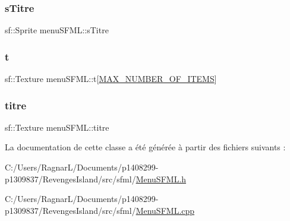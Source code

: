 \mbox{\label{classmenu_s_f_m_l_ad5b55373042af434e3db87a383f88ffe}} 
\subsubsection{\texorpdfstring{s\+Titre}{sTitre}}
{\footnotesize\ttfamily sf\+::\+Sprite menu\+S\+F\+M\+L\+::s\+Titre\hspace{0.3cm}{\ttfamily [private]}}

\mbox{\label{classmenu_s_f_m_l_ac268697287b7dc41dcae13b91193c6cf}} 
\subsubsection{\texorpdfstring{t}{t}}
{\footnotesize\ttfamily sf\+::\+Texture menu\+S\+F\+M\+L\+::t\mbox{[}\hyperlink{_menu_s_f_m_l_8h_a34e819be6bb222b369578bb037bb3564}{M\+A\+X\+\_\+\+N\+U\+M\+B\+E\+R\+\_\+\+O\+F\+\_\+\+I\+T\+E\+MS}\mbox{]}\hspace{0.3cm}{\ttfamily [private]}}

\mbox{\label{classmenu_s_f_m_l_ac26db2cb3d350a4a9bf501efccaa133e}} 
\subsubsection{\texorpdfstring{titre}{titre}}
{\footnotesize\ttfamily sf\+::\+Texture menu\+S\+F\+M\+L\+::titre\hspace{0.3cm}{\ttfamily [private]}}



La documentation de cette classe a été générée à partir des fichiers suivants \+:\begin{DoxyCompactItemize}
\item 
C\+:/\+Users/\+Ragnar\+L/\+Documents/p1408299-\/p1309837/\+Revenges\+Island/src/sfml/\hyperlink{_menu_s_f_m_l_8h}{Menu\+S\+F\+M\+L.\+h}\item 
C\+:/\+Users/\+Ragnar\+L/\+Documents/p1408299-\/p1309837/\+Revenges\+Island/src/sfml/\hyperlink{_menu_s_f_m_l_8cpp}{Menu\+S\+F\+M\+L.\+cpp}\end{DoxyCompactItemize}
